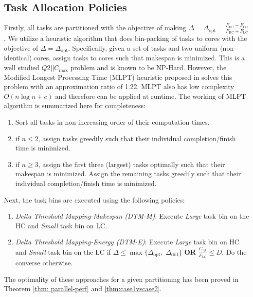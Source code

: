 \subsection{Task Allocation Policies}
Firstly, all tasks are partitioned with the objective of making $\Delta=\Delta_\mathrm{opt}=\frac{F_\mathrm{HC}-F_\mathrm{LC}}{F_\mathrm{HC}+F_\mathrm{LC}}$. We utilize a heuristic algorithm that does bin-packing of tasks to cores with the objective of $\Delta=\Delta_\mathrm{opt}$. Specifically, given a set of tasks and two uniform (non-identical) cores, assign tasks to cores such that makespan is minimized. This is a well studied $Q2||C_{\mathrm{max}}$ problem and is known to be NP-Hard. However, the Modified Longest Processing Time (MLPT) heuristic proposed in \cite{mlpt} solves this problem with an approximation ratio of 1.22. MLPT also has low complexity $O(n\log n +c)$ and therefore can be applied at runtime. The working of MLPT algorithm is summarized here for completeness:
\begin{enumerate}
	\item Sort all tasks in non-increasing order of their computation times.
	\item if $n\leq2$, assign tasks greedily such that their individual completion/finish time is minimized. 
	\item if $n\geq 3$, assign the first three (largest) tasks optimally such that their makespan is minimized. Assign the remaining tasks greedily such that their individual completion/finish time is minimized.
\end{enumerate}
Next, the task bins are executed using the following policies:
\begin{enumerate}
\item \emph{Delta Threshold Mapping-Makespan (DTM-M)}: Execute \textit{Large} task bin on the HC and \textit{Small} task bin on LC.
\item \emph{Delta Threshold Mapping-Energy (DTM-E)}: Execute \textit{Large} task bin on HC and \textit{Small} task bin on the LC if $\Delta \leq \max\{\Delta_\mathrm{opt},\;\Delta_\mathrm{diff}\}$ \textbf{OR} $\frac{C_\mathrm{Lg}}{F_\mathrm{LC}}\leq D$. %
Do the converse otherwise. 
\end{enumerate}
The optimality of these approaches for a given partitioning has been proved in Theorem \ref{thm: parallel-perf} and \ref{thm:case1vscase2}. 

